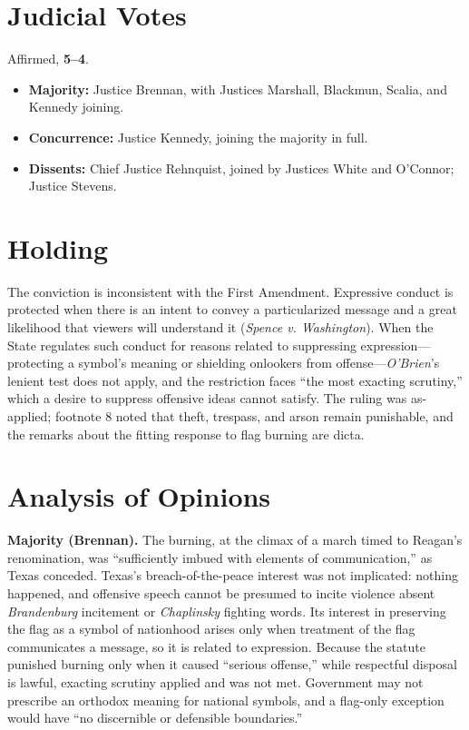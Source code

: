 \documentclass[12pt]{article}
\begin{document}
\section{Judicial Votes}

Affirmed, \textbf{5--4}.
\begin{itemize}
\item \textbf{Majority:} Justice Brennan, with Justices Marshall, Blackmun, Scalia, and Kennedy joining.
\item \textbf{Concurrence:} Justice Kennedy, joining the majority in full.
\item \textbf{Dissents:} Chief Justice Rehnquist, joined by Justices White and O'Connor; Justice Stevens.
\end{itemize}

\section{Holding}

The conviction is inconsistent with the First Amendment. Expressive conduct is protected when there is an intent to convey a particularized message and a great likelihood that viewers will understand it (\textit{Spence v. Washington}). When the State regulates such conduct for reasons related to suppressing expression---protecting a symbol's meaning or shielding onlookers from offense---\textit{O'Brien}'s lenient test does not apply, and the restriction faces ``the most exacting scrutiny,'' which a desire to suppress offensive ideas cannot satisfy. The ruling was as-applied; footnote 8 noted that theft, trespass, and arson remain punishable, and the remarks about the fitting response to flag burning are dicta.

\section{Analysis of Opinions}

\textbf{Majority (Brennan).} The burning, at the climax of a march timed to Reagan's renomination, was ``sufficiently imbued with elements of communication,'' as Texas conceded. Texas's breach-of-the-peace interest was not implicated: nothing happened, and offensive speech cannot be presumed to incite violence absent \textit{Brandenburg} incitement or \textit{Chaplinsky} fighting words. Its interest in preserving the flag as a symbol of nationhood arises only when treatment of the flag communicates a message, so it is related to expression. Because the statute punished burning only when it caused ``serious offense,'' while respectful disposal is lawful, exacting scrutiny applied and was not met. Government may not prescribe an orthodox meaning for national symbols, and a flag-only exception would have ``no discernible or defensible boundaries.''
\end{document}
